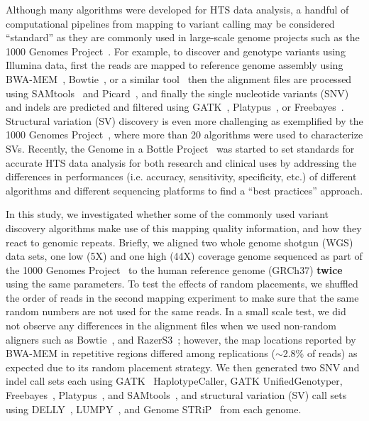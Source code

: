 \documentclass[10pt,a4paper]{article}
\begin{document}
Although many algorithms were developed for HTS data analysis, a handful of computational pipelines from mapping to variant calling may be considered ``standard'' as they are commonly used in large-scale genome projects such as the 1000 Genomes Project~\cite{1000GP,1000GP2012,1000GP2015}. For example, to discover and genotype variants using Illumina data, first the reads are mapped to reference genome assembly using BWA-MEM~\cite{Li2009a,Li2013}, Bowtie~\cite{Langmead2009}, or a similar tool~\cite{Alkan2009,Weese2012} then the alignment files are processed using SAMtools~\cite{Li2009b} and Picard~\cite{picard}, and finally the single nucleotide variants (SNV) and indels are predicted and filtered using GATK~\cite{DePristo2011}, Platypus~\cite{Rimmer2014}, or Freebayes~\cite{Garrison2012}. 
Structural variation (SV) discovery is even more challenging as exemplified by the 1000 Genomes Project~\cite{1000GP,1000GP2012,Mills2011}, where more than 20 algorithms were used to characterize SVs.
Recently, the Genome in a Bottle Project~\cite{Zook2014} was started to set standards for accurate HTS data analysis for both research and clinical uses by addressing the differences in performances (i.e. accuracy, sensitivity, specificity, etc.) of different algorithms and different sequencing platforms
 to find a ``best practices'' approach.

In this study, we investigated whether some of the commonly used variant discovery algorithms
make use of this mapping quality information, and how they react to genomic repeats.
Briefly, 
we aligned two whole genome shotgun (WGS) data sets, one low (5X) and one high (44X) coverage genome
sequenced as part of the 1000 Genomes Project~\cite{1000GP2012} to the human reference genome (GRCh37) {\bf twice} using the same parameters. 
To test the effects of random placements,
we shuffled the order of reads in the second mapping experiment to make sure that the same random numbers are not used for the same reads. 
In a small scale test, we did not observe any differences
in the alignment files when we used non-random aligners such as Bowtie~\cite{Langmead2009}, and RazerS3~\cite{Weese2012}; %
however, 
the map locations reported by BWA-MEM in repetitive regions differed among replications ($\sim$2.8\% of reads) as expected due to its random placement strategy.
We then generated two SNV and indel call sets each using GATK~\cite{DePristo2011} HaplotypeCaller, GATK UnifiedGenotyper, Freebayes~\cite{Garrison2012}, Platypus~\cite{Rimmer2014}, and SAMtools~\cite{Li2009b}, and structural variation (SV) call sets using DELLY~\cite{Rausch2012}, LUMPY~\cite{Layer2014}, and Genome STRiP~\cite{Handsaker2011,Handsaker2015} from each genome.
\end{document}
